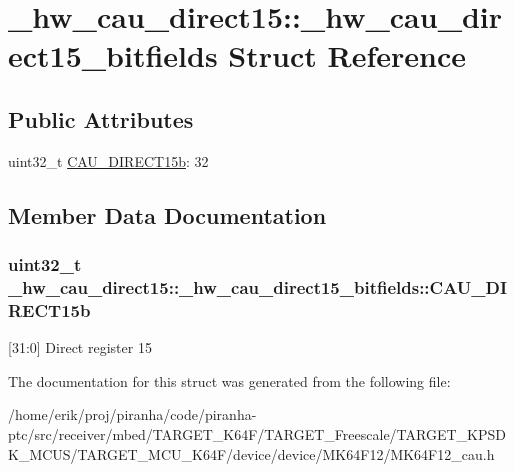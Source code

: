 \hypertarget{struct__hw__cau__direct15_1_1__hw__cau__direct15__bitfields}{}\section{\+\_\+hw\+\_\+cau\+\_\+direct15\+:\+:\+\_\+hw\+\_\+cau\+\_\+direct15\+\_\+bitfields Struct Reference}
\label{struct__hw__cau__direct15_1_1__hw__cau__direct15__bitfields}
\subsection*{Public Attributes}
\begin{DoxyCompactItemize}
\item 
uint32\+\_\+t \hyperlink{struct__hw__cau__direct15_1_1__hw__cau__direct15__bitfields_a84d375c7bffdbce3d84a7b084033b285}{C\+A\+U\+\_\+\+D\+I\+R\+E\+C\+T15b}\+: 32
\end{DoxyCompactItemize}


\subsection{Member Data Documentation}
\subsubsection[{\texorpdfstring{C\+A\+U\+\_\+\+D\+I\+R\+E\+C\+T15b}{CAU_DIRECT15b}}]{\setlength{\rightskip}{0pt plus 5cm}uint32\+\_\+t \+\_\+hw\+\_\+cau\+\_\+direct15\+::\+\_\+hw\+\_\+cau\+\_\+direct15\+\_\+bitfields\+::\+C\+A\+U\+\_\+\+D\+I\+R\+E\+C\+T15b}\hypertarget{struct__hw__cau__direct15_1_1__hw__cau__direct15__bitfields_a84d375c7bffdbce3d84a7b084033b285}{}\label{struct__hw__cau__direct15_1_1__hw__cau__direct15__bitfields_a84d375c7bffdbce3d84a7b084033b285}
\mbox{[}31\+:0\mbox{]} Direct register 15 

The documentation for this struct was generated from the following file\+:\begin{DoxyCompactItemize}
\item 
/home/erik/proj/piranha/code/piranha-\/ptc/src/receiver/mbed/\+T\+A\+R\+G\+E\+T\+\_\+\+K64\+F/\+T\+A\+R\+G\+E\+T\+\_\+\+Freescale/\+T\+A\+R\+G\+E\+T\+\_\+\+K\+P\+S\+D\+K\+\_\+\+M\+C\+U\+S/\+T\+A\+R\+G\+E\+T\+\_\+\+M\+C\+U\+\_\+\+K64\+F/device/device/\+M\+K64\+F12/M\+K64\+F12\+\_\+cau.\+h\end{DoxyCompactItemize}
